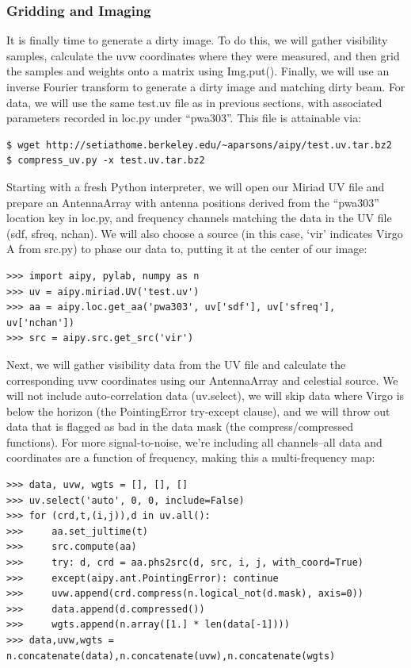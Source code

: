 \subsubsection{Gridding and Imaging}

It is finally time to generate a dirty image.  To do this, we will gather
visibility samples, calculate the uvw coordinates where they were measured,
and then grid the samples and weights onto a matrix using Img.put().  Finally,
we will use an inverse Fourier transform to generate a dirty image and
matching dirty beam.  For data, we will use the same test.uv file as in
previous sections, with associated parameters recorded in loc.py under
``pwa303''.  This file is attainable via:

\begin{verbatim}
$ wget http://setiathome.berkeley.edu/~aparsons/aipy/test.uv.tar.bz2
$ compress_uv.py -x test.uv.tar.bz2
\end{verbatim}

Starting with a fresh Python interpreter, we will open our Miriad UV file
and prepare an AntennaArray with antenna positions derived from the
``pwa303'' location key in loc.py, and frequency channels matching the
data in the UV file (sdf, sfreq, nchan).  We will also choose a source
(in this case, `vir' indicates Virgo A from src.py) to phase our data to, 
putting it at the center of our image:  

\begin{verbatim}
>>> import aipy, pylab, numpy as n
>>> uv = aipy.miriad.UV('test.uv')
>>> aa = aipy.loc.get_aa('pwa303', uv['sdf'], uv['sfreq'], uv['nchan'])
>>> src = aipy.src.get_src('vir')
\end{verbatim}

Next, we will gather visibility data from the UV file and calculate the
corresponding uvw coordinates using our AntennaArray and celestial source.
We will not include auto-correlation data (uv.select), we will skip 
data where Virgo is below the horizon (the PointingError try-except clause), 
and we will throw out data that is flagged as bad in the data mask 
(the compress/compressed functions).  For more signal-to-noise, we're
including all channels--all data and coordinates are a function of
frequency, making this a multi-frequency map:

\begin{verbatim}
>>> data, uvw, wgts = [], [], []
>>> uv.select('auto', 0, 0, include=False)
>>> for (crd,t,(i,j)),d in uv.all():
>>>     aa.set_jultime(t)
>>>     src.compute(aa)
>>>     try: d, crd = aa.phs2src(d, src, i, j, with_coord=True)
>>>     except(aipy.ant.PointingError): continue
>>>     uvw.append(crd.compress(n.logical_not(d.mask), axis=0))
>>>     data.append(d.compressed())
>>>     wgts.append(n.array([1.] * len(data[-1])))
>>> data,uvw,wgts = n.concatenate(data),n.concatenate(uvw),n.concatenate(wgts)
\end{verbatim}

